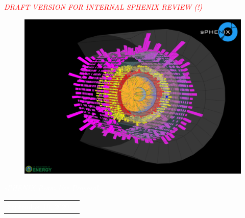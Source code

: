 \afterpage{\restorepagecolor}
\renewcommand*\familydefault{\sfdefault}
{\sffamily
\vfill

\begin{center}
    \emph{\Large{\textcolor{red}{DRAFT VERSION FOR INTERNAL SPHENIX REVIEW (!)}}}
\end{center}

\vfill


\vfill

\begin{figure}[htpb]
\begin{center}
\includegraphics[width=1.0\linewidth]{figs/EventDisplayAuAuLogo.pdf}
\end{center}
\end{figure}


\vfill

\begin{center}
  \textcolor{white}
  \large
  \emph{\Large{\textcolor{white}{sPHENIX Beam Use Proposal}}}
  
  \begin{tabular}{rl}
    \textcolor{white}{September 10, 2020}
  \end{tabular}
\end{center}
}



\renewcommand*\familydefault{\rmdefault}
